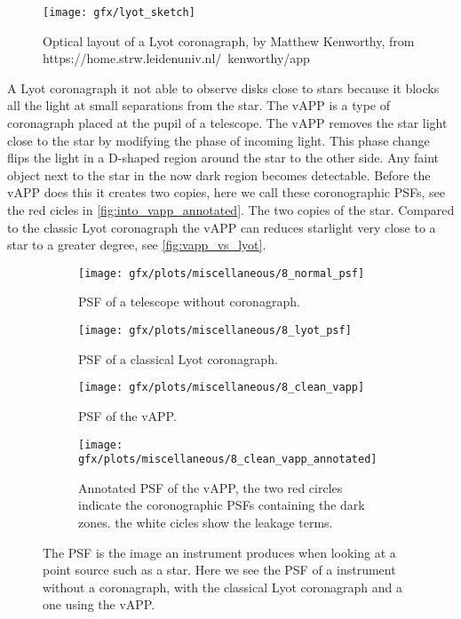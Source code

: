 \begin{figure}
    \texttt{[image: gfx/lyot\_sketch]}
    \caption{Optical layout of a Lyot coronagraph, by Matthew Kenworthy, from https://home.strw.leidenuniv.nl/~kenworthy/app}
    \label{fig:lyot_sketch}
\end {figure}

A Lyot coronagraph it not able to observe disks close to stars because it blocks all the light at small separations from the star. The \ac{vAPP} \cite{vapp_snik} is a type of coronagraph placed at the pupil of a telescope. The \ac{vAPP} removes the star light close to the star by modifying the phase of incoming light. This phase change flips the light in a D-shaped region around the star to the other side. Any faint object next to the star in the now dark region becomes detectable. Before the \ac{vAPP} does this it creates two copies, here we call these coronographic \acp{PSF}, see the red cicles in \autoref{fig:into_vapp_annotated}. The two copies of the star. Compared to the classic Lyot coronagraph the \ac{vAPP} can reduces starlight very close to a star to a greater degree, see \autoref{fig:vapp_vs_lyot}.  

\begin{figure}[h!]
      \begin{subfigure}[t]{0.5\textwidth}
        \texttt{[image: gfx/plots/miscellaneous/8\_normal\_psf]}
        \caption{\ac{PSF} of a telescope without coronagraph.}
        \label{fig:classic_psf}
      \end{subfigure}
      \begin{subfigure}[t]{0.5 \textwidth}
        \texttt{[image: gfx/plots/miscellaneous/8\_lyot\_psf]}
        \caption{\ac{PSF} of a classical Lyot coronagraph.}
        \label{fig:lyot}
      \end{subfigure}%
      
      \begin{subfigure}[t]{0.5\textwidth}
        \texttt{[image: gfx/plots/miscellaneous/8\_clean\_vapp]}
        \caption{\ac{PSF} of the \ac{vAPP}.}
        \label{fig:into_vapp}
      \end{subfigure}
      \begin{subfigure}[t]{0.5\textwidth}
        \texttt{[image: gfx/plots/miscellaneous/8\_clean\_vapp\_annotated]}
        \caption{Annotated \ac{PSF} of the \ac{vAPP}, the two red circles indicate the coronographic \acp{PSF} containing the dark zones. the white cicles show the leakage terms.}
        \label{fig:into_vapp_annotated}
      \end{subfigure}      
  \caption{The \ac{PSF} is the image an instrument produces when looking at a point source such as a star. Here we see the \ac{PSF} of a instrument without a coronagraph, with the classical Lyot coronagraph and a one using the \ac{vAPP}.}
  \label{fig:vapp_vs_lyot}
\end{figure}

